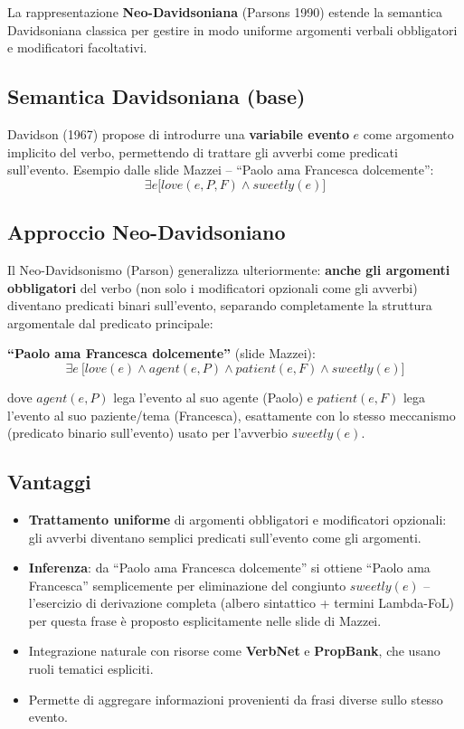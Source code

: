 \documentclass[12pt,a4paper]{article}
\begin{document}
La rappresentazione \textbf{Neo-Davidsoniana} (Parsons 1990) estende la semantica Davidsoniana classica per gestire in modo uniforme argomenti verbali obbligatori e modificatori facoltativi.

\subsection{Semantica Davidsoniana (base)}

Davidson (1967) propose di introdurre una \textbf{variabile evento} $e$ come argomento implicito del verbo, permettendo di trattare gli avverbi come predicati sull'evento. Esempio dalle slide Mazzei -- ``Paolo ama Francesca dolcemente'':
\[
\exists e\bigl[\mathit{love}(e, P, F) \wedge \mathit{sweetly}(e)\bigr]
\]

\subsection{Approccio Neo-Davidsoniano}

Il Neo-Davidsonismo (Parson) generalizza ulteriormente: \textbf{anche gli argomenti obbligatori} del verbo (non solo i modificatori opzionali come gli avverbi) diventano predicati binari sull'evento, separando completamente la struttura argomentale dal predicato principale:

\begin{defbox}
\textbf{``Paolo ama Francesca dolcemente''} (slide Mazzei):
\[
\exists e\ \bigl[\mathit{love}(e) \wedge \mathit{agent}(e,P) \wedge \mathit{patient}(e,F) \wedge \mathit{sweetly}(e)\bigr]
\]
\end{defbox}

dove $\mathit{agent}(e,P)$ lega l'evento al suo agente (Paolo) e $\mathit{patient}(e,F)$ lega l'evento al suo paziente/tema (Francesca), esattamente con lo stesso meccanismo (predicato binario sull'evento) usato per l'avverbio $\mathit{sweetly}(e)$.

\subsection{Vantaggi}

\begin{itemize}[leftmargin=1.5em]
  \item \textbf{Trattamento uniforme} di argomenti obbligatori e modificatori opzionali: gli avverbi diventano semplici predicati sull'evento come gli argomenti.
  \item \textbf{Inferenza}: da ``Paolo ama Francesca dolcemente'' si ottiene ``Paolo ama Francesca'' semplicemente per eliminazione del congiunto $\mathit{sweetly}(e)$ -- l'esercizio di derivazione completa (albero sintattico + termini Lambda-FoL) per questa frase è proposto esplicitamente nelle slide di Mazzei.
  \item Integrazione naturale con risorse come \textbf{VerbNet} e \textbf{PropBank}, che usano ruoli tematici espliciti.
  \item Permette di aggregare informazioni provenienti da frasi diverse sullo stesso evento.
\end{itemize}
\end{document}
